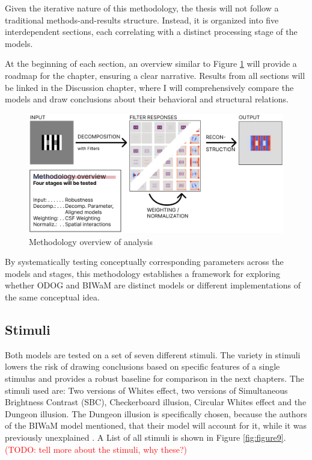 Given the iterative nature of this methodology, the thesis will not follow a traditional
methods-and-results structure. Instead, it is organized into five interdependent sections,
each correlating with a distinct processing stage of the models.

At the beginning of each section, an overview similar to Figure \ref{fig:figure8} will
provide a roadmap for the chapter, ensuring a clear narrative. Results from all sections
will be linked in the Discussion chapter, where I will comprehensively compare the models
and draw conclusions about their behavioral and structural relations. 

\begin{figure}[H]
    \centering
    \includegraphics[width=\linewidth]{media/methodology/methodology_overview.png}
    \begin{minipage}{0.8\textwidth}
    \caption{Methodology overview of analysis}
    \label{fig:figure8}
    \end{minipage}
\end{figure}

By systematically testing conceptually corresponding parameters across the models and
stages, this methodology establishes a framework for exploring whether ODOG and BIWaM are
distinct models or different implementations of the same conceptual idea.


\subsection{Stimuli}
Both models are tested on a set of seven different stimuli. The variety in stimuli lowers
the risk of drawing conclusions based on specific features of a single stimulus and
provides a robust baseline for comparison in the next chapters. The stimuli used are: Two
versions of Whites effect, two versions of Simultaneous Brightness Contrast (SBC),
Checkerboard illusion, Circular Whites effect and the Dungeon illusion. The Dungeon
illusion is specifically chosen, because the authors of the BIWaM model mentioned, that
their model will account for it, while it was previously unexplained
\parencite{Otazu2008}. A List of all stimuli is shown in Figure \ref{fig:figure9}. \\
\textcolor{red}{(TODO: tell more about the stimuli, why these?)}

